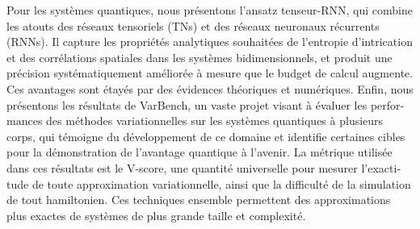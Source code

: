 \begin{otherlanguage}{french}
Pour les systèmes quantiques, nous présentons l'ansatz tenseur-RNN, qui combine les atouts des réseaux tensoriels (TNs) et des réseaux neuronaux récurrents (RNNs).
Il capture les propriétés analytiques souhaitées de l'entropie d'intrication et des corrélations spatiales dans les systèmes bidimensionnels, et produit une précision systématiquement améliorée à mesure que le budget de calcul augmente.
Ces avantages sont étayés par des évidences théoriques et numériques.
Enfin, nous présentons les résultats de VarBench, un vaste projet visant à évaluer les performances des méthodes variationnelles sur les systèmes quantiques à plusieurs corps, qui témoigne du développement de ce domaine et identifie certaines cibles pour la démonstration de l'avantage quantique à l'avenir.
La métrique utilisée dans ces résultats est le V-score, une quantité universelle pour mesurer l'exactitude de toute approximation variationnelle, ainsi que la difficulté de la simulation de tout hamiltonien.
Ces techniques ensemble permettent des approximations plus exactes de systèmes de plus grande taille et complexité.

\end{otherlanguage}

